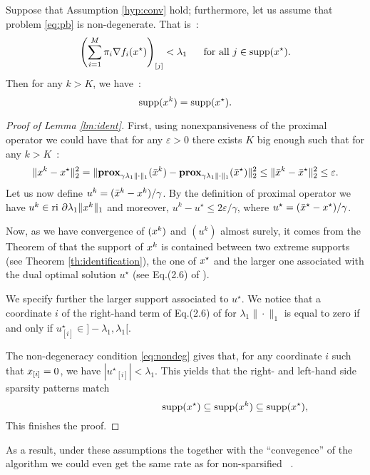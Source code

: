 \begin{lemma}[Identification]\label{lm:ident}
Suppose that Assumption \ref{hyp:conv} hold; furthermore, let us assume that problem \eqref{eq:pb} is non-degenerate. That is~:
\begin{equation}\label{eq:nondeg}
\left(\sum_{i=1}^M\pi_i\nabla f_i(x^\star)\right)_{[j]}<\lambda_1~~~~~\textnormal{for all $j\in\mathrm{supp}(x^\star)$}.
\end{equation}
Then for any $k>K$, we have~:
\begin{equation}
    \mathrm{supp} (x^k) = \mathrm{supp}(x^\star).
\end{equation}
\end{lemma}
\begin{proof}[Proof of Lemma \ref{lm:ident}]
First, using nonexpansiveness of the proximal operator we could have that for any $\varepsilon>0$ there exists $K$ big enough such that for any $k>K$~:
\[
\|x^k-x^\star\|_2^2 = \|\mathbf{prox}_{\gamma \lambda_1\|\cdot\|_1}(\bar{x}^k)-\mathbf{prox}_{\gamma \lambda_1\|\cdot\|_1}(\bar{x}^\star)\|_2^2\leq\|\bar{x}^k-\bar{x}^\star\|_2^2\leq\varepsilon.
\] 
Let us now define $u^k = (\bar{x}^k-x^k)/\gamma$. By the definition of proximal operator we have $u^k\in\textnormal{ri}~\partial \lambda_1\|x^k\|_1$ and moreover, $u^k-u^\star \leq 2\varepsilon/\gamma$, where $u^\star = (\bar{x}^\star - x^\star)/\gamma$.

Now, as we have convergence of $(x^k)$ and $(u^k)$ almost surely, it comes from the Theorem of  \cite{fadili2018sensitivity} that  the support of $x^k$ is contained between two extreme supports (see Theorem \ref{th:identification}), the one of $x^\star$ and the larger one associated with the dual optimal solution $u^\star$ (see Eq.\;(2.6) of \cite{fadili2018sensitivity}). 

We specify further the larger support associated to $u^\star$. We notice that a coordinate $i$ of the right-hand term of Eq.\;(2.6) of \cite{fadili2018sensitivity} for $\lambda_1 \|\cdot\|_1$ is equal to zero if and only if $u^\star_{[i]} \in ]-\lambda_1 , \lambda_1 [ $. 

The non-degeneracy condition \eqref{eq:nondeg} gives that, for any coordinate $i$ such that $x_{[i]} = 0$, we have $|{u^\star}_{[i]}| <\lambda_1 $. This yields that the right- and left-hand side sparsity patterns match
\[
\hspace{35mm}\supp(\w^\star) \subseteq \supp(\w^k)\subseteq \supp(\w^\star),
\]
This finishes the proof.
\end{proof}

As a result, under these assumptions the together with the ``convegence'' of the algorithm we could even get the same rate as for non-sparsified \dave~\cite{ICML18}.

